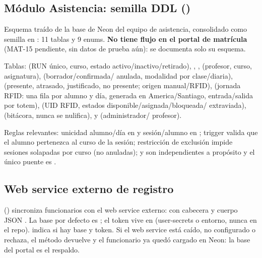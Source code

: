 \subsection{Módulo Asistencia: semilla DDL ()}

Esquema traído de la base  de Neon del equipo de
asistencia, consolidado como semilla en
: 11 tablas
y 9 enums. \textbf{No tiene flujo en el portal de matrícula} (MAT-15
pendiente, sin datos de prueba aún): se documenta solo su esquema.

Tablas:  (RUN único, curso, estado activo/inactivo/retirado),
, , 
(profesor, curso, asignatura),  (borrador/confirmada/
anulada, modalidad por clase/diaria),  (presente,
atrasado, justificado, no presente; origen manual/RFID),
 (jornada RFID: una fila por alumno y día, 
generada en America/Santiago, entrada/salida por totem),
 (UID RFID, estados disponible/asignada/bloqueada/
extraviada),  (bitácora, 
nunca se nulifica),  y  (administrador/
profesor).

Reglas relevantes: unicidad alumno/día en  y
sesión/alumno en ; trigger
 valida que el alumno pertenezca al curso de
la sesión; restricción de exclusión impide sesiones solapadas por curso
(no anuladas);  y  son
independientes a propósito y el único puente es .

\subsection{Web service externo de registro}

 () sincroniza funcionarios
con el web service externo: 
con cabecera  y cuerpo JSON
. La base por defecto es
; el token vive en
 (user-secrets o entorno, nunca en el repo).
 indica si hay base y token. Si el web service está caído,
no configurado o rechaza, el método devuelve  y el funcionario
ya quedó cargado en Neon: la base del portal es el respaldo.

